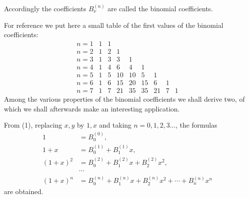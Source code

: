 \documentclass[11pt]{article}
\begin{document}
Accordingly the coefficients $B_\nu^{(n)}$ are called the binomial coefficients.

For reference we put here a small table of the first values of the binomial coefficients:
\[
\begin{array}{c|rrrrrrrr}
 n=1&1&1\\
 n=2&1&2&1\\
 n=3&1&3&3&1\\
 n=4&1&4&6&4&1\\
 n=5&1&5&10&10&5&1\\
 n=6&1&6&15&20&15&6&1\\
 n=7&1&7&21&35&35&21&7&1
\end{array}
\]
Among the various properties of the binomial coefficients we shall derive two, of which we shall afterwards make an interesting application.

From (1), replacing $x,y$ by $1,x$ and taking $n=0,1,2,3\ldots$, the formulas
\begin{equation}
\begin{aligned}
1&=B_0^{(0)},\\
1+x&=B_0^{(1)}+B_1^{(1)}x,\\
(1+x)^2&=B_0^{(2)}+B_1^{(2)}x+B_2^{(2)}x^2,\\
&\cdots\\
(1+x)^n&=B_0^{(n)}+B_1^{(n)}x+B_2^{(n)}x^2+\cdots+B_n^{(n)}x^n
\end{aligned}
\tag{2}
\end{equation}
are obtained.
\end{document}
